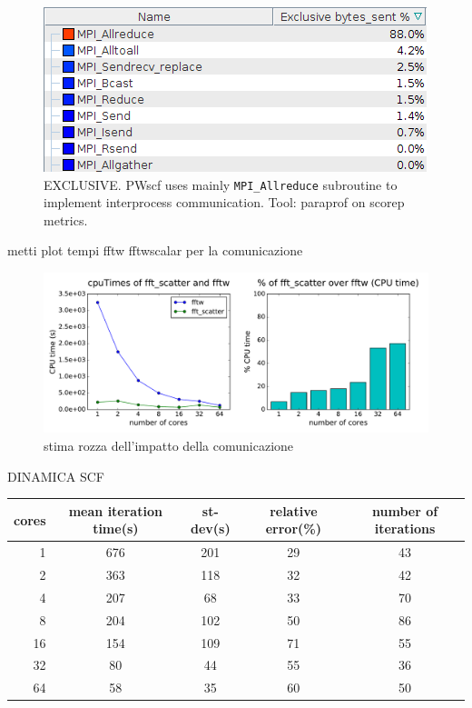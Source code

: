 \documentclass[a4paper,12pt]{article}
\begin{document}
\begin{figure}[hhh!]
	\centerline{\includegraphics[scale=0.5]{mpi_exclusive_bytes_sent.png}}
	\caption{ EXCLUSIVE. PWscf uses mainly \texttt{MPI\_Allreduce} subroutine to implement interprocess communication. Tool: paraprof on scorep metrics.
	}
	\label{fig:MPIinclusive}
\end{figure}


\newpage

metti plot tempi fftw fftwscalar per la comunicazione
\begin{figure}[hhh!]
	\centerline{\includegraphics[width=1.2\linewidth]{fftw_vs_fft_scatter.pdf}}
	\caption{ stima rozza dell'impatto della comunicazione
	}
	\label{fig:fftwvsfftscatter}
\end{figure}


\newpage

DINAMICA SCF
\begin{center}
\begin{tabular}{r|cccc}
\toprule
cores &        mean iteration time(s) &         st-dev(s) &   relative error(\%) &   number of iterations \\
\midrule
1  &  676 &  201 &  29 &  43 \\
2  &  363 &  118 &  32 &  42 \\
4  &  207 &   68 &  33 &  70 \\
8  &  204 &  102 &  50 &  86 \\
16 &  154 &  109 &  71 &  55 \\
32 &   80 &   44 &  55 &  36 \\
64 &   58 &   35 &  60 &  50 \\
\bottomrule
\end{tabular}
\end{center}
\end{document}
